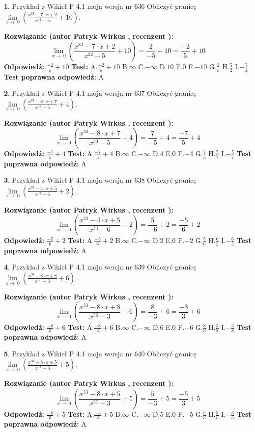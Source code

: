 \documentclass[12pt, a4paper]{article}
\theoremstyle{definition} %
\newtheorem{zad}{}
\newcommand{\zadStart}[1]{\begin{zad}#1\newline}
\newcommand{\zadStop}{\end{zad}}
\newcommand{\rozwStart}[2]{\noindent \textbf{Rozwiązanie (autor #1 , recenzent #2): }\newline}
\newcommand{\rozwStop}{\newline}
\newcommand{\odpStart}{\noindent \textbf{Odpowiedź:}\newline}
\newcommand{\odpStop}{\newline}
\newcommand{\testStart}{\noindent \textbf{Test:}\newline}
\newcommand{\testStop}{\newline}
\newcommand{\kluczStart}{\noindent \textbf{Test poprawna odpowiedź:}\newline}
\newcommand{\kluczStop}{\newline}
\begin{document}
\zadStart{Przykład z Wikieł P 4.1 moja wersja nr 636}
Obliczyć granicę $\lim\limits_{x\to\ 0}(\frac{x^{33}-7 \cdot x +2}{x^{32}-5}+10)$.
\zadStop
\rozwStart{Patryk Wirkus}{}
$$\lim\limits_{x\to\ 0}(\frac{x^{33}-7 \cdot x +2}{x^{32}-5}+10)=\frac{2}{-5}+10=\frac{-2}{5}+10$$
\rozwStop
\odpStart
$\frac{-2}{5}+10$
\odpStop
\testStart
A.$\frac{-2}{5}+10$
B.$\infty$
C.$-\infty$
D.$10$
E.$0$
F.$-10$
G.$\frac{2}{5}$
H.$\frac{5}{2}$
I.$-\frac{5}{2}$
\testStop
\kluczStart
A
\kluczStop



\zadStart{Przykład z Wikieł P 4.1 moja wersja nr 637}
Obliczyć granicę $\lim\limits_{x\to\ 0}(\frac{x^{33}-8 \cdot x +7}{x^{33}-5}+4)$.
\zadStop
\rozwStart{Patryk Wirkus}{}
$$\lim\limits_{x\to\ 0}(\frac{x^{33}-8 \cdot x +7}{x^{33}-5}+4)=\frac{7}{-5}+4=\frac{-7}{5}+4$$
\rozwStop
\odpStart
$\frac{-7}{5}+4$
\odpStop
\testStart
A.$\frac{-7}{5}+4$
B.$\infty$
C.$-\infty$
D.$4$
E.$0$
F.$-4$
G.$\frac{7}{5}$
H.$\frac{5}{7}$
I.$-\frac{5}{7}$
\testStop
\kluczStart
A
\kluczStop



\zadStart{Przykład z Wikieł P 4.1 moja wersja nr 638}
Obliczyć granicę $\lim\limits_{x\to\ 0}(\frac{x^{33}-4 \cdot x +5}{x^{34}-6}+2)$.
\zadStop
\rozwStart{Patryk Wirkus}{}
$$\lim\limits_{x\to\ 0}(\frac{x^{33}-4 \cdot x +5}{x^{34}-6}+2)=\frac{5}{-6}+2=\frac{-5}{6}+2$$
\rozwStop
\odpStart
$\frac{-5}{6}+2$
\odpStop
\testStart
A.$\frac{-5}{6}+2$
B.$\infty$
C.$-\infty$
D.$2$
E.$0$
F.$-2$
G.$\frac{5}{6}$
H.$\frac{6}{5}$
I.$-\frac{6}{5}$
\testStop
\kluczStart
A
\kluczStop



\zadStart{Przykład z Wikieł P 4.1 moja wersja nr 639}
Obliczyć granicę $\lim\limits_{x\to\ 0}(\frac{x^{33}-8 \cdot x +8}{x^{36}-3}+6)$.
\zadStop
\rozwStart{Patryk Wirkus}{}
$$\lim\limits_{x\to\ 0}(\frac{x^{33}-8 \cdot x +8}{x^{36}-3}+6)=\frac{8}{-3}+6=\frac{-8}{3}+6$$
\rozwStop
\odpStart
$\frac{-8}{3}+6$
\odpStop
\testStart
A.$\frac{-8}{3}+6$
B.$\infty$
C.$-\infty$
D.$6$
E.$0$
F.$-6$
G.$\frac{8}{3}$
H.$\frac{3}{8}$
I.$-\frac{3}{8}$
\testStop
\kluczStart
A
\kluczStop



\zadStart{Przykład z Wikieł P 4.1 moja wersja nr 640}
Obliczyć granicę $\lim\limits_{x\to\ 0}(\frac{x^{33}-8 \cdot x +5}{x^{37}-3}+5)$.
\zadStop
\rozwStart{Patryk Wirkus}{}
$$\lim\limits_{x\to\ 0}(\frac{x^{33}-8 \cdot x +5}{x^{37}-3}+5)=\frac{5}{-3}+5=\frac{-5}{3}+5$$
\rozwStop
\odpStart
$\frac{-5}{3}+5$
\odpStop
\testStart
A.$\frac{-5}{3}+5$
B.$\infty$
C.$-\infty$
D.$5$
E.$0$
F.$-5$
G.$\frac{5}{3}$
H.$\frac{3}{5}$
I.$-\frac{3}{5}$
\testStop
\kluczStart
A
\kluczStop
\end{document}
